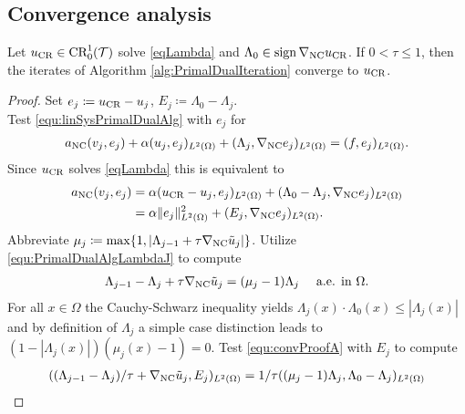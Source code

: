 \subsection{Convergence analysis}

\begin{theorem}
  Let $u_{\textup{CR}}\in \textup{CR}^1_0(\mathcal T)$ solve \eqref{eqLambda}
  and $\Lambda_0\in\operatorname{sign}\nabla_\textup{NC}u_\textup{CR}$.
  If $0 < \tau \leq 1$, then the iterates of Algorithm
  \ref{alg:PrimalDualIteration} converge to $u_{\textup{CR}}$.
\end{theorem}

\begin{proof}
  Set $e_j \coloneqq u_{\textup{CR}}-u_j$, $E_j\coloneqq \Lambda_0-\Lambda_j$.\\
  Test \eqref{equ:linSysPrimalDualAlg} with $e_j$ for
  \begin{align*}
    a_\textup{NC}(v_j,e_j) + \alpha(u_j,e_j)_{L^2(\Omega)} 
    + (\Lambda_j,\nabla_\textup{NC}e_j)_{L^2(\Omega)}
    = 
    (f,e_j)_{L^2(\Omega)}.
  \end{align*}
  Since $u_{\textup{CR}}$ solves \eqref{eqLambda} this is equivalent to
  \begin{align}
    \label{equ:convProofE}
    a_\textup{NC}(v_j,e_j) &= 
    \alpha(u_\textup{CR}-u_j,e_j)_{L^2(\Omega)} 
    + (\Lambda_0-\Lambda_j,\nabla_\textup{NC}e_j)_{L^2(\Omega)} \notag\\
    &= 
    \alpha\Vert e_j\Vert_{L^2(\Omega)}^2
    + (E_j,\nabla_\textup{NC}e_j)_{L^2(\Omega)}.
  \end{align}
  Abbreviate $\mu_j\coloneqq \max\{1,|\Lambda_{j-1}+\tau
  \nabla_\textup{NC}\tilde{u}_j|\}$.
  Utilize \eqref{equ:PrimalDualAlgLambdaJ} to compute
  \begin{align}
    \label{equ:convProofA}
    \Lambda_{j-1}-\Lambda_j+\tau \nabla_\textup{NC}\tilde{u}_j 
    = (\mu_j-1)\Lambda_j \quad\text{ a.e. in }\Omega.
  \end{align}
  For all $x\in\Omega$ the Cauchy-Schwarz inequality yields
  $\Lambda_j(x)\cdot\Lambda_0(x)\leq|\Lambda_j(x)|$ 
  and by definition of $\Lambda_j$ a simple case distinction leads to
  $(1-|\Lambda_j(x)|)(\mu_j(x)-1)=0$.
  Test \eqref{equ:convProofA} with $E_j$ to compute
  \begin{align*}
    ( (\Lambda_{j-1}-\Lambda_j)/\tau+\nabla_\textup{NC}\tilde{u}_j,
    E_j)_{L^2(\Omega)}
    &= 
    1/\tau ( (\mu_j-1)\Lambda_j,\Lambda_0-\Lambda_j)_{L^2(\Omega)}\\

\end{align*}
\end{proof}
